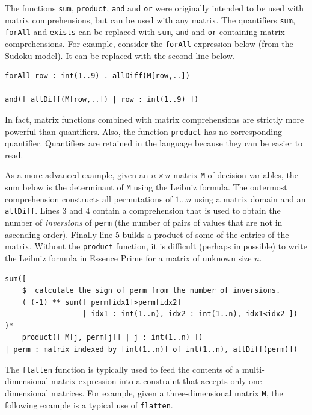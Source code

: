 \documentclass[a4paper]{article}
\newcommand{\eprime}{{\sc Essence Prime}\xspace}
\begin{document}
The functions \texttt{sum}, \texttt{product}, \texttt{and} and \texttt{or} were originally
intended to be used with matrix comprehensions, but can be used with any matrix. 
The quantifiers \texttt{sum}, \texttt{forAll} and \texttt{exists}
can be replaced with \texttt{sum}, \texttt{and} and \texttt{or} containing matrix comprehensions. 
For example, consider the \texttt{forAll} expression below (from the Sudoku model). It can be replaced with
the second line below. 

\begin{verbatim}
forAll row : int(1..9) . allDiff(M[row,..])

and([ allDiff(M[row,..]) | row : int(1..9) ])
\end{verbatim}

In fact, matrix functions combined with matrix comprehensions are strictly more
powerful than quantifiers. Also, the function \texttt{product} has no corresponding
quantifier. Quantifiers are retained in the language because they can be easier to read.

As a more advanced example, given an $n\times n$ matrix \texttt{M} of decision variables, the sum below
is the determinant of \texttt{M} using the Leibniz formula. The outermost comprehension
constructs all permutations of $1\ldots n$ using a matrix domain and an \texttt{allDiff}.
Lines 3 and 4 contain a comprehension that is used to obtain the number of \textit{inversions}
of \texttt{perm} (the number of pairs of values that are not in ascending order). 
Finally line 5 builds a product of some of the entries of the matrix. 
Without the \texttt{product} function, it is difficult (perhaps impossible) to write the Leibniz formula
in \eprime for a matrix of unknown size $n$. 

\begin{verbatim}
sum([
    $  calculate the sign of perm from the number of inversions. 
    ( (-1) ** sum([ perm[idx1]>perm[idx2] 
                  | idx1 : int(1..n), idx2 : int(1..n), idx1<idx2 ]) )*   
    product([ M[j, perm[j]] | j : int(1..n) ])
| perm : matrix indexed by [int(1..n)] of int(1..n), allDiff(perm)])
\end{verbatim}

The \texttt{flatten} function is typically used to feed the contents of a 
multi-dimensional matrix expression into a constraint that accepts only 
one-dimensional matrices. For example, given a three-dimensional matrix \texttt{M},
the following example is a typical use of \texttt{flatten}.  
\end{document}
